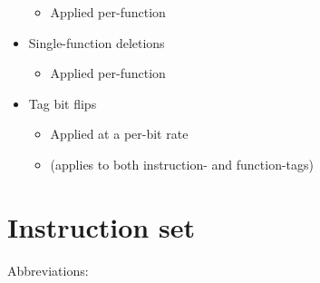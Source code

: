 \documentclass[]{book}
\providecommand{\tightlist}{%
  \setlength{\itemsep}{0pt}\setlength{\parskip}{0pt}}
\begin{document}
\begin{itemize}
  \begin{itemize}
  \tightlist
  \item
    Applied per-function
  \end{itemize}
\item
  Single-function deletions

  \begin{itemize}
  \tightlist
  \item
    Applied per-function
  \end{itemize}
\item
  Tag bit flips

  \begin{itemize}
  \tightlist
  \item
    Applied at a per-bit rate
  \item
    (applies to both instruction- and function-tags)
  \end{itemize}
\end{itemize}

\hypertarget{instruction-set}{%
\section{Instruction set}\label{instruction-set}}

Abbreviations:
\end{document}
